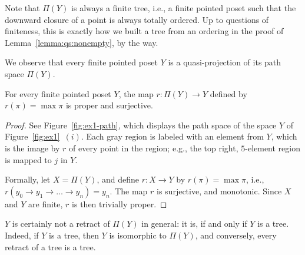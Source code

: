 \documentclass{LMCS}
\begin{document}
Note that $\Pi (Y)$ is always a finite tree, i.e., a finite pointed
poset such that the downward closure of a point is always totally
ordered.  Up to questions of finiteness, this is exactly how we built
a tree from an ordering in the proof of Lemma~\ref{lemma:qs:nonempty},
by the way.

We observe that every finite pointed poset $Y$ is a quasi-projection
of its path space $\Pi (Y)$.
\begin{lem}
  \label{lemma:path:qretr}
  For every finite pointed poset $Y$, the map $r : \Pi (Y) \to Y$
  defined by $r (\pi) = \max \pi$ is proper and surjective.
\end{lem}
\begin{proof}
  See Figure~\ref{fig:ex1-path}, which displays the path space of the
  space $Y$ of Figure~\ref{fig:ex1}~$(i)$.  Each gray region is
  labeled with an element from $Y$, which is the image by $r$ of every
  point in the region; e.g., the top right, $5$-element region is
  mapped to $j$ in $Y$.

  Formally, let $X = \Pi (Y)$, and define $r : X \to Y$ by $r (\pi) =
  \max \pi$, i.e., $r (y_0\to y_1 \to \ldots \to y_n) = y_n$.  The map
  $r$ is surjective, and monotonic.  Since $X$ and $Y$ are finite, $r$ is
  then trivially proper.
\end{proof}
$Y$ is certainly not a retract of $\Pi (Y)$ in general: it is, if and
only if $Y$ is a tree.  Indeed, if $Y$ is a tree, then $Y$ is
isomorphic to $\Pi (Y)$, and conversely, every retract of a tree is a
tree.
\end{document}
